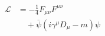 \documentclass[preview]{standalone}
\begin{document}
\begin{align*}
\begin{aligned} \mathcal{L}  &= -\frac{1}{4}  F_{\mu\nu} F^{\mu\nu}  \\&\quad +  \bar{\psi} (i \gamma^\mu   D_\mu  - m)\psi\end{aligned}
\end{align*}
\end{document}
